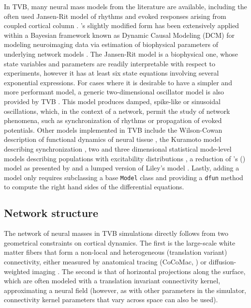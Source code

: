 \documentclass{bioinfo}
\begin{document}
	In TVB, many neural mass models from the literature are available, including
	the often used Jansen-Rit model of rhythms and evoked responses arising from
	coupled cortical column \citep{Zetterberg_1978, Jansen_1995,Spiegler_2010}. 
	\citeauthor{David_2003}'s slightly modified form has been extensively
	applied within a Bayesian framework known as Dynamic Causal Modeling (DCM) 
	for modeling neuroimaging data via estimation of biophysical parameters of 
	underlying network models \citep{David_2003, friston2003dynamic, david2006dynamic}.
	The Jansen-Rit model is a biophysical one, whose state variables and parameters 
	are readily interpretable with respect to experiments, however it has
	at least six state equations involving several exponential expressions. For
	cases where it is desirable to have a simpler and more performant 
	model, a generic two-dimensional oscillator model is also provided by TVB 
        \citep{strogatz2001nonlinear, guckenheimer1983nonlinear}.
	This model produces damped, spike-like or sinusoidal oscillations, which, in
	the context of a network, permit the study of network phenomena, such as 
	synchronization of rhythms or propagation of evoked potentials.
	Other models implemented in TVB include the Wilson-Cowan description of
	functional dynamics of neural tissue \citep{Wilson_1972}, the Kuramoto
	model describing synchronization \citep{Kuramoto_1975, Cabral_2011}, two
	and three dimensional statistical mode-level models describing populations with
	excitability distributions \citep{Stefanescu_2011, Stefanescu_2008}, a
	reduction of \citeauthor{Wong_2006}'s (\citeyear{Wong_2006}) model as presented 
	by \cite{Deco_2013} and a lumped version of Liley's model \citep{Liley_1999, Steyn-Ross_1999}.
	Lastly, adding a model only requires subclassing a base \texttt{Model} class and
	providing a  \texttt{dfun} method to compute the right hand sides of the
	differential equations. 

\subsection{Network structure}

	The network of neural masses in TVB simulations directly follows from  two
	 geometrical constraints on cortical dynamics. The first is the
	large-scale white matter fibers that form a non-local and heterogeneous
	(translation variant) connectivity, either measured by anatomical tracing
	(CoCoMac, \cite{Koetter_2004}) or diffusion-weighted imaging 
    \citep{Hagmann_2008, Honey_2009, Bastiani_2012}.
    The second is that of horizontal projections
	along the surface, which are often modeled with a translation invariant
    connectivity kernel, approximating a neural field (however, as with other
    parameters in the simulator, connectivity kernel parameters that vary 
	across space can also be used).
\end{document}
